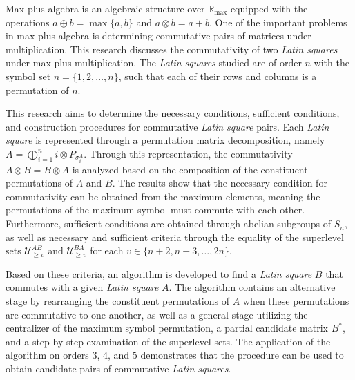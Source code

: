 Max-plus algebra is an algebraic structure over $\mathbb{R}_{\max}$ equipped with the operations $a\oplus b=\max\{a,b\}$ and $a\otimes b=a+b$. One of the important problems in max-plus algebra is determining commutative pairs of matrices under multiplication. This research discusses the commutativity of two \textit{Latin squares} under max-plus multiplication. The \textit{Latin squares} studied are of order $n$ with the symbol set $\underline{n}=\{1,2,\ldots,n\}$, such that each of their rows and columns is a permutation of $\underline{n}$.

This research aims to determine the necessary conditions, sufficient conditions, and construction procedures for commutative \textit{Latin square} pairs. Each \textit{Latin square} is represented through a permutation matrix decomposition, namely $A=\bigoplus_{i=1}^{n} i\otimes P_{\sigma_i^A}$. Through this representation, the commutativity $A\otimes B=B\otimes A$ is analyzed based on the composition of the constituent permutations of $A$ and $B$. The results show that the necessary condition for commutativity can be obtained from the maximum elements, meaning the permutations of the maximum symbol must commute with each other. Furthermore, sufficient conditions are obtained through abelian subgroups of $S_n$, as well as necessary and sufficient criteria through the equality of the superlevel sets $\mathcal{U}_{\ge v}^{AB}$ and $\mathcal{U}_{\ge v}^{BA}$ for each $v\in\{n+2,n+3,\ldots,2n\}$.

Based on these criteria, an algorithm is developed to find a \textit{Latin square} $B$ that commutes with a given \textit{Latin square} $A$. The algorithm contains an alternative stage by rearranging the constituent permutations of $A$ when these permutations are commutative to one another, as well as a general stage utilizing the centralizer of the maximum symbol permutation, a partial candidate matrix $B^*$, and a step-by-step examination of the superlevel sets. The application of the algorithm on orders $3$, $4$, and $5$ demonstrates that the procedure can be used to obtain candidate pairs of commutative \textit{Latin squares}.




